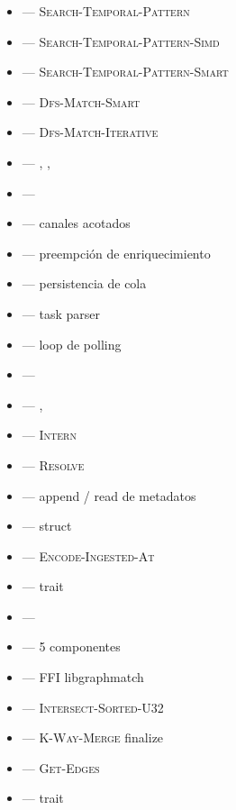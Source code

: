 \begin{itemize}
    \item {} --- \textsc{Search-Temporal-Pattern}
    \item {} --- \textsc{Search-Temporal-Pattern-Simd}
    \item {} --- \textsc{Search-Temporal-Pattern-Smart}
    \item {} --- \textsc{Dfs-Match-Smart}
    \item {} --- \textsc{Dfs-Match-Iterative}
    \item {} --- ,
        , 
    \item {} --- 
    \item {} --- canales acotados
    \item {} --- preempción de enriquecimiento
    \item {} --- persistencia de cola
    \item {} --- task parser
    \item {} --- loop de polling
    \item {} --- 
    \item {} --- ,
    \item {} --- \textsc{Intern}
    \item {} --- \textsc{Resolve}
    \item {} --- append / read de metadatos
    \item {} --- struct \Compact{}
    \item {} --- \textsc{Encode-Ingested-At}
    \item {} --- trait 
    \item {} --- 
    \item {} --- 5 componentes
    \item {} --- FFI libgraphmatch
    \item {} --- \textsc{Intersect-Sorted-U32}
    \item {} --- \textsc{K-Way-Merge} finalize
    \item {} --- \textsc{Get-Edges}
    \item {} --- trait 
\end{itemize}

